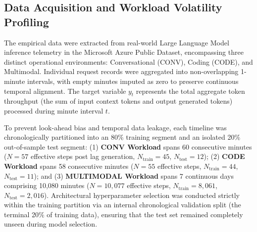 \documentclass[conference, a4paper]{IEEEtran}
\begin{document}
\subsection{Data Acquisition and Workload Volatility Profiling}
The empirical data were extracted from real-world Large Language Model inference telemetry in the Microsoft Azure Public Dataset, encompassing three distinct operational environments: Conversational (CONV), Coding (CODE), and Multimodal. Individual request records were aggregated into non-overlapping 1-minute intervals, with empty minutes imputed as zero to preserve continuous temporal alignment. The target variable $y_t$ represents the total aggregate token throughput (the sum of input context tokens and output generated tokens) processed during minute interval $t$.

To prevent look-ahead bias and temporal data leakage, each timeline was chronologically partitioned into an 80\% training segment and an isolated 20\% out-of-sample test segment: (1) \textbf{CONV Workload} spans 60 consecutive minutes ($N=57$ effective steps post lag generation, $N_{\text{train}}=45$, $N_{\text{test}}=12$); (2) \textbf{CODE Workload} spans 58 consecutive minutes ($N=55$ effective steps, $N_{\text{train}}=44$, $N_{\text{test}}=11$); and (3) \textbf{MULTIMODAL Workload} spans 7 continuous days comprising 10,080 minutes ($N=10,077$ effective steps, $N_{\text{train}}=8,061$, $N_{\text{test}}=2,016$). Architectural hyperparameter selection was conducted strictly within the training partition via an internal chronological validation split (the terminal 20\% of training data), ensuring that the test set remained completely unseen during model selection.


\begin{table}[htbp]
\caption{Statistical and Volatility Profiling of Azure LLM Workloads}
\label{tab:workload_stats}
\centering
{}
\end{table}
\end{document}
